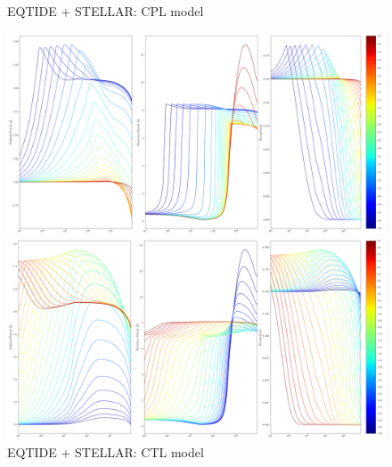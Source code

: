 \documentclass[]{aastex631}
\begin{document}
\begin{figure}[ht!]
\begin{center}
	\caption{EQTIDE + STELLAR: CPL model}
	\includegraphics[width=\linewidth]{../analysis/results_likelihood_1d/cpl_stellar_eqtide/plots/vary_q_evolution.png} 
	\caption{EQTIDE + STELLAR: CTL model}
	\includegraphics[width=\linewidth]{../analysis/results_likelihood_1d/ctl_stellar_eqtide/plots/vary_tau_evolution.png} 
\end{center}
\end{figure}


\end{document}

